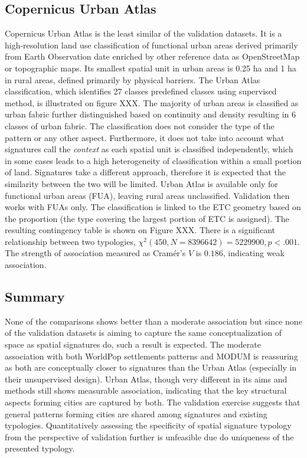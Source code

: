 \subsection*{Copernicus Urban Atlas}
Copernicus Urban Atlas is the least similar of the validation datasets. It is a
high-resolution land use classification of functional urban areas derived primarily from
Earth Observation date enriched by other reference data as OpenStreetMap or topographic
maps. Its smallest spatial unit in urban areas is 0.25 ha and 1 ha in rural areas,
defined primarily by physical barriers. The Urban Atlas classification, which identifies
27 classes predefined classes using supervised method, is illustrated on figure XXX.
The majority of urban areas is classified as urban fabric further distinguished based on
continuity and density resulting in 6 classes of urban fabric. The classification does
not consider the type of the pattern or any other aspect. Furthermore, it does not take
into account what signatures call the \textit{context} as each spatial unit is
classified independently, which in some cases leads to a high heterogeneity of
classification within a small portion of land. Signatures take a different approach,
therefore it is expected that the similarity between the two will be limited.
Urban Atlas is available only for functional urban areas (FUA), leaving rural areas
unclassified. Validation then works with FUAs only. The classification is linked to the
ETC geometry based on the proportion (the type covering the largest portion of ETC is
assigned). The resulting contingency table is shown on Figure XXX. There is a
significant relationship between two typologies, $\chi^{2} (450, N = 8396642) = 5229900,
p < .001$. The strength of association measured as Cramér's $V$ is $0.186$, indicating
weak association.

\subsection*{Summary}
None of the comparisons shows better than a moderate association but since none of the
validation datasets is aiming to capture the same conceptualization of space as spatial
signatures do, such a result is expected. The moderate association with both WorldPop
settlements patterns and MODUM is reassuring as both are conceptually closer to
signatures than the Urban Atlas (especially in their unsupervised design). Urban Atlas,
though very different in its aims and methods still shows measurable association,
indicating that the key structural aspects forming cities are captured by both. The
validation exercise suggests that general patterns forming cities are shared among
signatures and existing typologies. Quantitatively assessing the specificity of spatial
signature typology from the perspective of validation further is unfeasible due do
uniqueness of the presented typology.